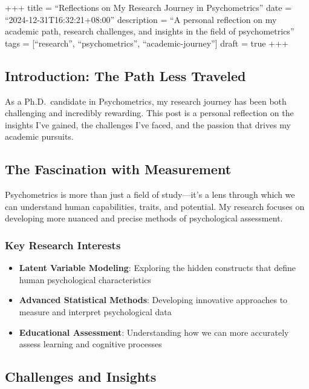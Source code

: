 \documentclass[
]{article}
\author{}
\date{\vspace{-2.5em}}
\providecommand{\tightlist}{%
  \setlength{\itemsep}{0pt}\setlength{\parskip}{0pt}}
\begin{document}
+++ title = ``Reflections on My Research Journey in Psychometrics'' date
= ``2024-12-31T16:32:21+08:00'' description = ``A personal reflection on
my academic path, research challenges, and insights in the field of
psychometrics'' tags = {[}``research'', ``psychometrics'',
``academic-journey''{]} draft = true +++

\subsection{Introduction: The Path Less
Traveled}\label{introduction-the-path-less-traveled}

As a Ph.D.~candidate in Psychometrics, my research journey has been both
challenging and incredibly rewarding. This post is a personal reflection
on the insights I've gained, the challenges I've faced, and the passion
that drives my academic pursuits.

\subsection{The Fascination with
Measurement}\label{the-fascination-with-measurement}

Psychometrics is more than just a field of study---it's a lens through
which we can understand human capabilities, traits, and potential. My
research focuses on developing more nuanced and precise methods of
psychological assessment.

\subsubsection{Key Research Interests}\label{key-research-interests}

\begin{itemize}
\tightlist
\item
  \textbf{Latent Variable Modeling}: Exploring the hidden constructs
  that define human psychological characteristics
\item
  \textbf{Advanced Statistical Methods}: Developing innovative
  approaches to measure and interpret psychological data
\item
  \textbf{Educational Assessment}: Understanding how we can more
  accurately assess learning and cognitive processes
\end{itemize}

\subsection{Challenges and Insights}\label{challenges-and-insights}
\end{document}
